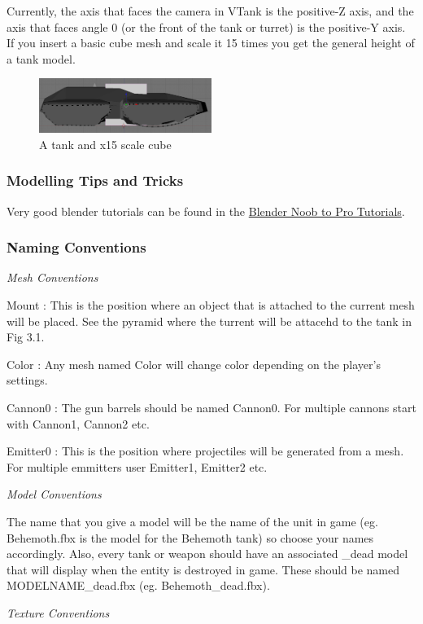 Currently, the axis that faces the camera in VTank is the positive-Z axis, and the axis that faces angle 0 (or the front of the tank or turret) is the positive-Y axis. If you insert a basic cube mesh and scale it 15 times you get the general height of a tank model. 
\begin{figure}[h]
	\centering
		\includegraphics[width=0.50\textwidth]{Figures/tankAndCube.png}
	\caption{A tank and  x15 scale cube}
	\label{fig:Scale Sample}
\end{figure}


\subsubsection {Modelling Tips and Tricks}
Very good blender tutorials can be found in the \href{http://en.wikibooks.org/wiki/Blender_3D:_Noob_to_Pro}{Blender Noob to Pro Tutorials}.

\subsubsection {Naming Conventions}
\textit{Mesh Conventions}

Mount : This is the position where an object that is attached to the current mesh will be placed. See the pyramid where the turrent will be attacehd to the tank in Fig 3.1.

Color : Any mesh named Color will change color depending on the player's settings.

Cannon0 : The gun barrels should be named Cannon0. For multiple cannons start with Cannon1, Cannon2 etc.

Emitter0 : This is the position where projectiles will be generated from a mesh. For multiple emmitters user Emitter1, Emitter2 etc. 

\textit{Model Conventions}

The name that you give a model will be the name of the unit in game (eg. Behemoth.fbx is the model for the Behemoth tank) so choose your names accordingly. Also, every tank or weapon should have an associated \_dead model that will display when the entity is destroyed in game. These should be named MODELNAME\_dead.fbx (eg. Behemoth\_dead.fbx).

\textit{Texture Conventions}

